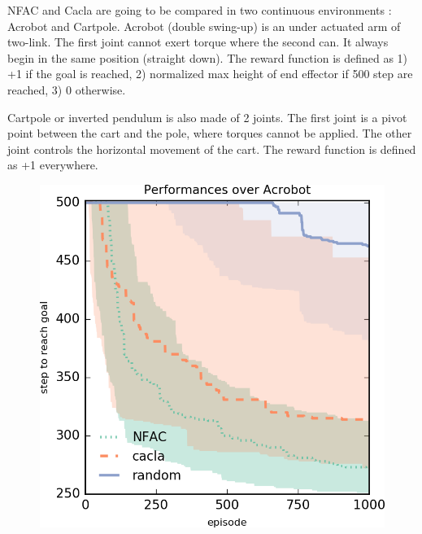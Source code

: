 
NFAC and Cacla are going to be compared in two continuous environments : Acrobot and Cartpole.
Acrobot (double swing-up) is an under actuated arm of two-link. The first joint
cannot exert torque where the second can.
It always begin in the same position (straight down).
The reward function is defined as 1) +1 if the goal is reached, 2) normalized max 
height of end effector if 500 step are reached, 3) 0 otherwise.

Cartpole or inverted pendulum is also made of 2 joints. The first joint is a pivot point 
between the cart and the pole, where torques cannot be applied. The other joint controls
the horizontal movement of the cart.
The reward function is defined as +1 everywhere.

\begin{figure}[h]
\centering
\begin{minipage}{.5\textwidth}
  \centering
  \includegraphics[width=0.95\linewidth]{result_plotting/adacrobot-1ddl_perf.png}
\end{minipage}%
\begin{minipage}{.5\textwidth}
  \centering

\end{minipage}
\end{figure}

